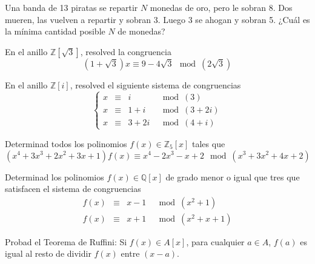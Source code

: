 \begin{ejercicio}
    Una banda de 13 piratas se repartir $N$ monedas de oro, pero le sobran 8. Dos mueren, las vuelven a repartir y sobran 3. Luego 3 se ahogan y sobran 5. ¿Cuál es la mínima cantidad posible $N$ de monedas?
\end{ejercicio}

\begin{ejercicio}
    En el anillo $\mathbb{Z}\left[\sqrt{3}\right]$, resolved la congruencia
    \begin{equation*}
        (1+\sqrt{3})x\equiv 9-4\sqrt{3}\mod(2\sqrt{3})
    \end{equation*}
\end{ejercicio}

\begin{ejercicio}
    En el anillo $\mathbb{Z}[i]$, resolved el siguiente sistema de congruencias
    \begin{equation*}
        \left\{\begin{array}{cccl}
                x & \equiv & i & \mod(3) \\
                x & \equiv & 1+i & \mod(3+2i) \\
                x & \equiv & 3+2i & \mod(4+i)
        \end{array}\right.
    \end{equation*}
\end{ejercicio}

\begin{ejercicio}
    Determinad todos los polinomios $f(x)\in \mathbb{Z}_5[x]$ tales que
    \begin{equation*}
        (x^4+3x^3+2x^2+3x+1)f(x) \equiv x^4-2x^3-x+2\mod(x^3+3x^2+4x+2)
    \end{equation*}
\end{ejercicio}

\begin{ejercicio}
    Determinad los polinomios $f(x)\in \mathbb{Q}[x]$ de grado menor o igual que tres que satisfacen el sistema de congruencias
    \begin{equation*}
        \begin{array}{cccl}
            f(x) & \equiv & x-1 & \mod(x^2+1) \\
            f(x) & \equiv & x+1 & \mod(x^2+x+1)
        \end{array}
    \end{equation*}
\end{ejercicio}

\begin{ejercicio}
    Probad el Teorema de Ruffini:\newline
    Si $f(x)\in A[x]$, para cualquier $a\in A$, $f(a)$ es igual al resto de dividir $f(x)$ entre $(x-a)$.
\end{ejercicio}

